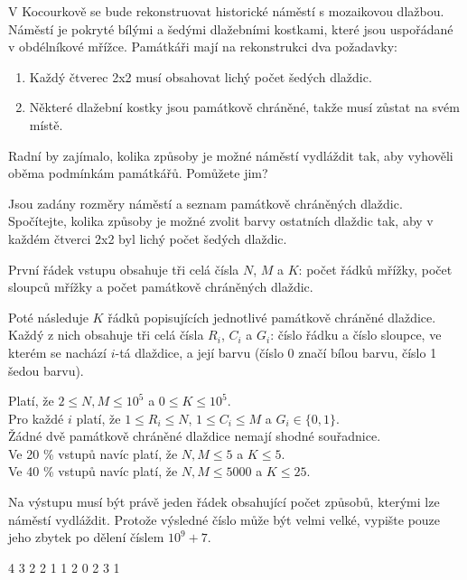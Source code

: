 





V Kocourkově se bude rekonstruovat historické náměstí s mozaikovou dlažbou.
Náměstí je pokryté bílými a šedými dlažebními kostkami, které jsou uspořádané
v obdélníkové mřížce. Památkáři mají na rekonstrukci dva požadavky:

\begin{enumerate}[nolistsep]
\item Každý čtverec 2x2 musí obsahovat lichý počet šedých dlaždic.
\item Některé dlažební kostky jsou památkově chráněné, takže musí zůstat na svém
  místě.
\end{enumerate}

Radní by zajímalo, kolika způsoby je možné náměstí vydláždit tak, aby vyhověli
oběma podmínkám památkářů. Pomůžete jim?


Jsou zadány rozměry náměstí a seznam památkově chráněných dlaždic. Spočítejte,
kolika způsoby je možné zvolit barvy ostatních dlaždic tak, aby v každém čtverci
2x2 byl lichý počet šedých dlaždic.


První řádek vstupu obsahuje tři celá čísla $N$, $M$ a $K$: počet řádků mřížky,
počet sloupců mřížky a počet památkově chráněných dlaždic.

Poté následuje $K$ řádků popisujících jednotlivé památkově chráněné dlaždice.
Každý z nich obsahuje tři celá čísla $R_i$, $C_i$ a $G_i$: číslo řádku a číslo
sloupce, ve kterém se nachází $i$-tá dlaždice, a její barvu (číslo 0 značí bílou
barvu, číslo 1 šedou barvu).

\bigskip
\noindent
Platí, že $2 \leq N,M \leq 10^5$ a $0 \leq K \leq 10^5$.\\
Pro každé $i$ platí, že $1 \leq R_i \leq N$, $1 \leq C_i \leq M$ a
  $G_i \in \{ 0, 1 \}$.\\
Žádné dvě památkově chráněné dlaždice nemají shodné souřadnice.\\
Ve 20 \% vstupů navíc platí, že $N,M \leq 5$ a $K \leq 5$.\\
Ve 40 \% vstupů navíc platí, že $N,M \leq 5000$ a $K \leq 25$.


Na výstupu musí být právě jeden řádek obsahující počet způsobů, kterými lze
náměstí vydláždit. Protože výsledné číslo může být velmi velké, vypište pouze
jeho zbytek po dělení číslem $10^9 + 7$.


 4 3
2 2 1
1 2 0
2 3 1
\sampleEND


